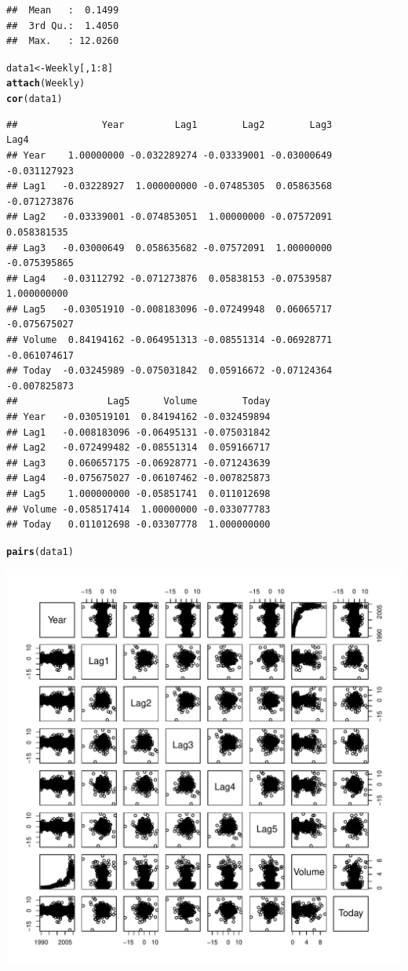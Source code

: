 \documentclass{article}\usepackage[]{graphicx}\usepackage[]{color}
\makeatletter
\def\maxwidth{ %
  \ifdim\Gin@nat@width>\linewidth
    \linewidth
  \else
    \Gin@nat@width
  \fi
}
\newcommand{\hlnum}[1]{\textcolor[rgb]{0.686,0.059,0.569}{#1}}%
\newcommand{\hlopt}[1]{\textcolor[rgb]{0,0,0}{#1}}%
\newcommand{\hlstd}[1]{\textcolor[rgb]{0.345,0.345,0.345}{#1}}%
\newcommand{\hlkwb}[1]{\textcolor[rgb]{0.69,0.353,0.396}{#1}}%
\newcommand{\hlkwd}[1]{\textcolor[rgb]{0.737,0.353,0.396}{\textbf{#1}}}%
\newenvironment{kframe}{%
 \def\at@end@of@kframe{}%
 \ifinner\ifhmode%
  \def\at@end@of@kframe{\end{minipage}}%
  \begin{minipage}{\columnwidth}%
 \fi\fi%
 \def\FrameCommand##1{\hskip\@totalleftmargin \hskip-\fboxsep
 \colorbox{shadecolor}{##1}\hskip-\fboxsep
     \hskip-\linewidth \hskip-\@totalleftmargin \hskip\columnwidth}%
 \MakeFramed {\advance\hsize-\width
   \@totalleftmargin\z@ \linewidth\hsize
   \@setminipage}}%
 {\par\unskip\endMakeFramed%
 \at@end@of@kframe}
\newenvironment{knitrout}{}{} %
\makeatother
\begin{document}
\begin{enumerate}[(a)]
\begin{knitrout}
\begin{kframe}
\begin{verbatim}
##  Mean   :  0.1499             
##  3rd Qu.:  1.4050             
##  Max.   : 12.0260
\end{verbatim}
\begin{alltt}
\hlstd{data1}\hlkwb{<-}\hlstd{Weekly[,}\hlnum{1}\hlopt{:}\hlnum{8}\hlstd{]}
\hlkwd{attach}\hlstd{(Weekly)}
\hlkwd{cor}\hlstd{(data1)}
\end{alltt}
\begin{verbatim}
##               Year         Lag1        Lag2        Lag3         Lag4
## Year    1.00000000 -0.032289274 -0.03339001 -0.03000649 -0.031127923
## Lag1   -0.03228927  1.000000000 -0.07485305  0.05863568 -0.071273876
## Lag2   -0.03339001 -0.074853051  1.00000000 -0.07572091  0.058381535
## Lag3   -0.03000649  0.058635682 -0.07572091  1.00000000 -0.075395865
## Lag4   -0.03112792 -0.071273876  0.05838153 -0.07539587  1.000000000
## Lag5   -0.03051910 -0.008183096 -0.07249948  0.06065717 -0.075675027
## Volume  0.84194162 -0.064951313 -0.08551314 -0.06928771 -0.061074617
## Today  -0.03245989 -0.075031842  0.05916672 -0.07124364 -0.007825873
##                Lag5      Volume        Today
## Year   -0.030519101  0.84194162 -0.032459894
## Lag1   -0.008183096 -0.06495131 -0.075031842
## Lag2   -0.072499482 -0.08551314  0.059166717
## Lag3    0.060657175 -0.06928771 -0.071243639
## Lag4   -0.075675027 -0.06107462 -0.007825873
## Lag5    1.000000000 -0.05851741  0.011012698
## Volume -0.058517414  1.00000000 -0.033077783
## Today   0.011012698 -0.03307778  1.000000000
\end{verbatim}
\begin{alltt}
\hlkwd{pairs}\hlstd{(data1)}
\end{alltt}
\end{kframe}
\includegraphics[width=\maxwidth]{figure/unnamed-chunk-2-1} 


\end{knitrout}
\end{enumerate}
\end{document}
